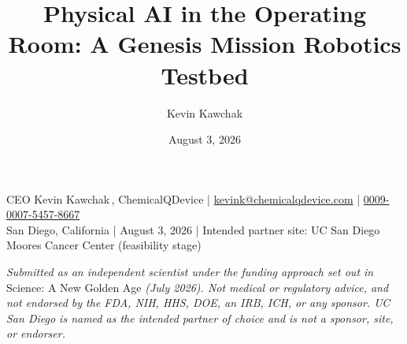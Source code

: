 \documentclass[11pt]{article}
\title{Physical AI in the Operating Room: A Genesis Mission Robotics Testbed}
\author{Kevin Kawchak}
\date{August 3, 2026}
\begin{document}
\thispagestyle{plain}


\vspace{0.3em}

\begin{center}
 \enspace {} \enspace
{} \enspace {}
\end{center}

\vspace{-0.35em}
\apprule{0.8pt}

\noindent\small CEO Kevin Kawchak\,,
ChemicalQDevice \;|\;
\href{mailto:kevink@chemicalqdevice.com}{kevink@chemicalqdevice.com} \;|\;
\href{https://orcid.org/0009-0007-5457-8667}{0009-0007-5457-8667}\\
San Diego, California \;|\; August 3, 2026 \;|\; Intended partner site: UC San
Diego Moores Cancer Center (feasibility stage)\normalsize\par

\vspace{0.05em}

\noindent\footnotesize\textit{Submitted as an independent scientist under the
funding approach set out in} Science: A New Golden Age \textit{(July 2026). Not
medical or regulatory advice, and not endorsed by the FDA, NIH, HHS, DOE, an
IRB, ICH, or any sponsor. UC San Diego is named as the intended partner of
choice and is not a sponsor, site, or endorser.}\normalsize\par

\vspace{-0.1em}
\apprule{0.4pt}







\end{document}

